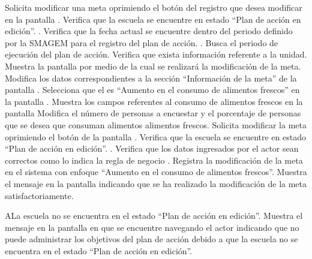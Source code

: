 \begin{UCtrayectoria}
	\UCpaso[\UCactor] Solicita modificar una meta oprimiendo el botón \botEdit del registro que desea modificar en la pantalla .
	\UCpaso[\UCsist] Verifica que la escuela se encuentre en  estado ``Plan de acción en edición''. .
	\UCpaso[\UCsist] Verifica que la fecha actual se encuentre dentro del periodo definido por la SMAGEM para el registro del plan de acción. .	
	\UCpaso[\UCsist] Busca el periodo de ejecución del plan de acción.
	\UCpaso[\UCsist] Verifica que exista información referente a la unidad. 
	\UCpaso[\UCsist] Muestra la pantalla  por medio de la cual se realizará la modificación de la meta.
	\UCpaso[\UCactor] Modifica los datos correspondientes a la sección ``Información de la meta'' de la pantalla . \label{cupcr2:ingresaDatos}
	\UCpaso[\UCactor] Selecciona que el  es ``Aumento en el consumo de alimentos frescos'' en la pantalla . 
	\UCpaso[\UCsist] Muestra los campos referentes al consumo de alimentos frescos en la pantalla 
	\UCpaso[\UCactor] Modifica el número de personas a encuestar y el porcentaje de personas que se desea que consuman alimentos alimentos frescos.
	\UCpaso[\UCactor] Solicita modificar la meta oprimiendo el botón  de la pantalla . 
	\UCpaso[\UCsist] Verifica que la escuela se encuentre en  estado ``Plan de acción en edición''. .	
	\UCpaso[\UCsist] Verifica que los datos ingresados por el actor sean correctos como lo indica la regla de negocio .   
	\UCpaso[\UCsist] Registra la modificación de la meta en el sistema con enfoque ``Aumento en el consumo de alimentos frescos''.
	\UCpaso[\UCsist] Muestra el mensaje  en la pantalla  indicando que se ha realizado la modificación de la meta satisfactoriamente. \label{cupcr2:muestraMensaje}
\end{UCtrayectoria}


\begin{UCtrayectoriaA}{A}{La escuela no se encuentra en el estado ``Plan de acción en edición''.}
    \UCpaso[\UCsist] Muestra el mensaje  en la pantalla en que se encuentre navegando el actor indicando que no puede administrar los objetivos del plan de acción debido a que la escuela no se encuentra en el estado ``Plan de acción en edición''. 
 \end{UCtrayectoriaA}
 
